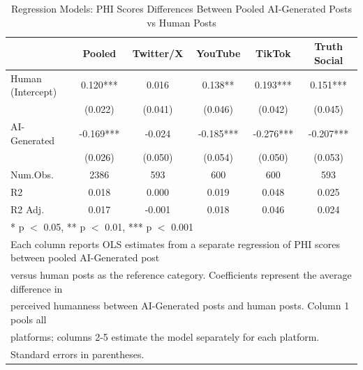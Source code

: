 \begin{table}
\centering
\caption{Regression Models: PHI Scores Differences Between Pooled AI-Generated Posts vs Human Posts}
\centering
\begin{tabular}[t]{lccccc}
\toprule
  & Pooled & Twitter/X & YouTube & TikTok & Truth Social\\
\midrule
Human (Intercept) & 0.120*** & 0.016 & 0.138** & 0.193*** & 0.151***\\
 & (0.022) & (0.041) & (0.046) & (0.042) & (0.045)\\
AI-Generated & -0.169*** & -0.024 & -0.185*** & -0.276*** & -0.207***\\
 & (0.026) & (0.050) & (0.054) & (0.050) & (0.053)\\
\midrule
Num.Obs. & 2386 & 593 & 600 & 600 & 593\\
R2 & 0.018 & 0.000 & 0.019 & 0.048 & 0.025\\
R2 Adj. & 0.017 & -0.001 & 0.018 & 0.046 & 0.024\\
\bottomrule
\multicolumn{6}{l}{\rule{0pt}{1em}* p $<$ 0.05, ** p $<$ 0.01, *** p $<$ 0.001}\\
\multicolumn{6}{l}{\rule{0pt}{1em}Each column reports OLS estimates from a separate regression of PHI scores between pooled AI-Generated post}\\
\multicolumn{6}{l}{\rule{0pt}{1em}versus human posts as the reference category. Coefficients represent the average difference in}\\
\multicolumn{6}{l}{\rule{0pt}{1em}perceived humanness between AI-Generated posts and human posts. Column 1 pools all}\\
\multicolumn{6}{l}{\rule{0pt}{1em}platforms; columns 2-5 estimate the model separately for each platform.}\\
\multicolumn{6}{l}{\rule{0pt}{1em}Standard errors in parentheses.}\\
\end{tabular}
\end{table}
